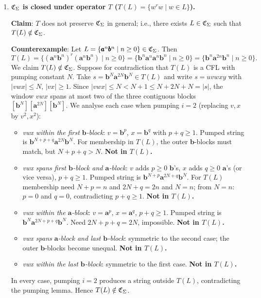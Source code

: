 \begin{enumerate}[{9.}1. ]
\item \textbf{$\mathfrak{C}_\Sigma$ is closed under operator $T$ ($T(L) = \{w^r w \mid w \in L\}$).}

\textbf{Claim}: $T$ does not preserve $\mathfrak{C}_\Sigma$ in general; i.e., there exists $L\in\mathfrak{C}_\Sigma$ such that $T(L)\notin\mathfrak{C}_\Sigma$.

\textbf{Counterexample}: Let $L = \{\pmb{a}^n\pmb{b}^n \mid n \geq 0\} \in \mathfrak{C}_\Sigma$. Then
\[
  T(L) = \{(\pmb{a}^n\pmb{b}^n)^r(\pmb{a}^n\pmb{b}^n) \mid n\geq 0\} = \{\pmb{b}^n\pmb{a}^n\pmb{a}^n\pmb{b}^n \mid n\geq 0\} = \{\pmb{b}^n\pmb{a}^{2n}\pmb{b}^n \mid n\geq 0\}.
\]
We claim $T(L) \notin \mathfrak{C}_\Sigma$. Suppose for contradiction that $T(L)$ is a CFL with pumping constant $N$. Take $s = \pmb{b}^N\pmb{a}^{2N}\pmb{b}^N \in T(L)$ and write $s=uvwxy$ with $|vwx|\leq N$, $|vx|\geq 1$. Since $|vwx|\leq N < N+1 \leq N+2N+N = |s|$, the window $vwx$ spans at most two of the three contiguous blocks $[\pmb{b}^N][\pmb{a}^{2N}][\pmb{b}^N]$. We analyse each case when pumping $i=2$ (replacing $v,x$ by $v^2,x^2$):

\begin{itemize}
\item \textit{vwx within the first $\pmb{b}$-block}: $v=\pmb{b}^p$, $x=\pmb{b}^q$ with $p+q\geq 1$. Pumped string is $\pmb{b}^{N+p+q}\pmb{a}^{2N}\pmb{b}^N$. For membership in $T(L)$, the outer $\pmb{b}$-blocks must match, but $N+p+q > N$. \textbf{Not in $T(L)$.}
\item \textit{vwx spans first $\pmb{b}$-block and $\pmb{a}$-block}: $v$ adds $p\geq 0$ $\pmb{b}$'s, $x$ adds $q\geq 0$ $\pmb{a}$'s (or vice versa), $p+q\geq 1$. Pumped string is $\pmb{b}^{N+p}\pmb{a}^{2N+q}\pmb{b}^N$. For $T(L)$ membership need $N+p = n$ and $2N+q = 2n$ and $N = n$; from $N=n$: $p=0$ and $q=0$, contradicting $p+q\geq 1$. \textbf{Not in $T(L)$.}
\item \textit{vwx within the $\pmb{a}$-block}: $v=\pmb{a}^p$, $x=\pmb{a}^q$, $p+q\geq 1$. Pumped string is $\pmb{b}^N\pmb{a}^{2N+p+q}\pmb{b}^N$. Need $2N+p+q = 2N$, impossible. \textbf{Not in $T(L)$.}
\item \textit{vwx spans $\pmb{a}$-block and last $\pmb{b}$-block}: symmetric to the second case; the outer $\pmb{b}$-blocks become unequal. \textbf{Not in $T(L)$.}
\item \textit{vwx within the last $\pmb{b}$-block}: symmetric to the first case. \textbf{Not in $T(L)$.}
\end{itemize}
In every case, pumping $i=2$ produces a string outside $T(L)$, contradicting the pumping lemma. Hence $T(L)\notin\mathfrak{C}_\Sigma$.


\end{enumerate}
